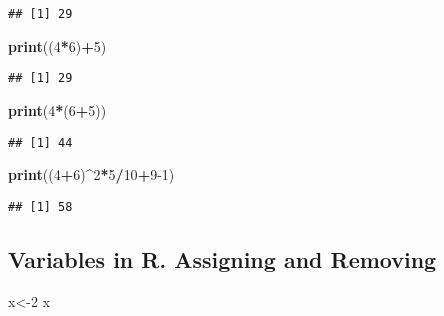 \documentclass[
]{article}
\newenvironment{Shaded}{\begin{snugshade}}{\end{snugshade}}
\newcommand{\DecValTok}[1]{\textcolor[rgb]{0.00,0.00,0.81}{#1}}
\newcommand{\FunctionTok}[1]{\textcolor[rgb]{0.13,0.29,0.53}{\textbf{#1}}}
\newcommand{\NormalTok}[1]{#1}
\newcommand{\OtherTok}[1]{\textcolor[rgb]{0.56,0.35,0.01}{#1}}
\newcommand{\SpecialCharTok}[1]{\textcolor[rgb]{0.81,0.36,0.00}{\textbf{#1}}}
\begin{document}
\begin{verbatim}
## [1] 29
\end{verbatim}

\begin{Shaded}
\begin{Highlighting}[]
\FunctionTok{print}\NormalTok{((}\DecValTok{4}\SpecialCharTok{*}\DecValTok{6}\NormalTok{)}\SpecialCharTok{+}\DecValTok{5}\NormalTok{)}
\end{Highlighting}
\end{Shaded}

\begin{verbatim}
## [1] 29
\end{verbatim}

\begin{Shaded}
\begin{Highlighting}[]
\FunctionTok{print}\NormalTok{(}\DecValTok{4}\SpecialCharTok{*}\NormalTok{(}\DecValTok{6}\SpecialCharTok{+}\DecValTok{5}\NormalTok{))}
\end{Highlighting}
\end{Shaded}

\begin{verbatim}
## [1] 44
\end{verbatim}

\begin{Shaded}
\begin{Highlighting}[]
\FunctionTok{print}\NormalTok{((}\DecValTok{4}\SpecialCharTok{+}\DecValTok{6}\NormalTok{)}\SpecialCharTok{\^{}}\DecValTok{2}\SpecialCharTok{*}\DecValTok{5}\SpecialCharTok{/}\DecValTok{10}\SpecialCharTok{+}\DecValTok{9{-}1}\NormalTok{)}
\end{Highlighting}
\end{Shaded}

\begin{verbatim}
## [1] 58
\end{verbatim}

\subsection{Variables in R. Assigning and
Removing}\label{variables-in-r.-assigning-and-removing}

\begin{Shaded}
\begin{Highlighting}[]
\NormalTok{x}\OtherTok{\textless{}{-}}\DecValTok{2}
\NormalTok{x}
\end{Highlighting}
\end{Shaded}
\end{document}
